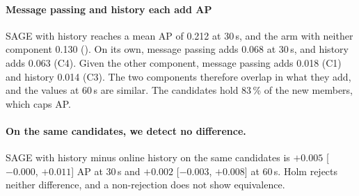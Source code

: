 
\paragraph{Message passing and history each add AP}
SAGE with history reaches a mean AP of 0.212 at 30\,s, and the arm with neither component 0.130 ().
On its own, message passing adds 0.068 at 30\,s, and history adds 0.063 (C4).
Given the other component, message passing adds 0.018 (C1) and history 0.014 (C3).
The two components therefore overlap in what they add, and the values at 60\,s are similar.
The candidates hold 83\,\% of the new members, which caps AP\@.

\paragraph{On the same candidates, we detect no difference.}
SAGE with history minus online history on the same candidates is $+0.005$ [$-0.000$, $+0.011$] AP at 30\,s and $+0.002$ [$-0.003$, $+0.008$] at 60\,s.
Holm rejects neither difference, and a non-rejection does not show equivalence.

